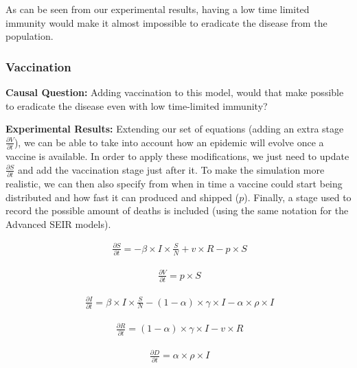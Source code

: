 As can be seen from our experimental results, having a low time limited immunity would make it almost impossible to eradicate the disease from the population. 

\subsubsection{Vaccination}

\textbf{Causal Question:} Adding vaccination to this model, would that make possible to eradicate the disease even with low time-limited immunity?

\textbf{Experimental Results:} Extending our set of equations (adding an extra stage $\frac{\partial V}{\partial t}$), we can be able to take into account how an epidemic will evolve once a vaccine is available. In order to apply these modifications, we just need to update $\frac{\partial S}{\partial t}$ and add the vaccination stage just after it. To make the simulation more realistic, we can then also specify from when in time a vaccine could start being distributed and how fast it can produced and shipped ($p$). Finally, a stage used to record the possible amount of deaths is included (using the same notation for the Advanced SEIR models).

\useshortskip
\begin{align}
\ \frac{\partial S}{\partial t} = -\beta \times I \times \frac{S}{N} + v \times R - p \times S
\end{align}
\useshortskip

\useshortskip
\begin{align}
\ \frac{\partial V}{\partial t} = p \times S
\end{align}
\useshortskip

\useshortskip
\begin{align}
\ \frac{\partial I}{\partial t} = \beta \times I \times \frac{S}{N}  -(1-\alpha) \times \gamma \times I -\alpha \times \rho \times I
\end{align}
\useshortskip

\useshortskip
\begin{align}
\ \frac{\partial R}{\partial t} = (1-\alpha) \times \gamma \times I - v \times R
\end{align}
\useshortskip

\useshortskip
\begin{align}
\ \frac{\partial D}{\partial t} = \alpha \times \rho \times I
\end{align}
\useshortskip

